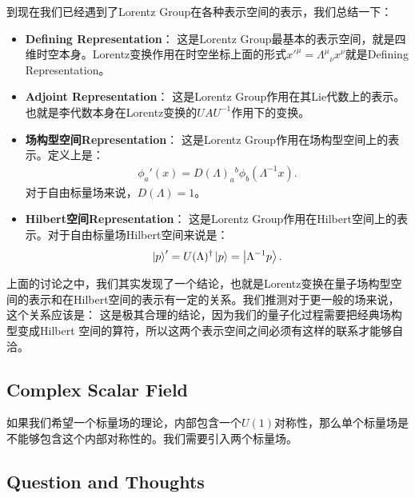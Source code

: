 到现在我们已经遇到了Lorentz Group在各种表示空间的表示，我们总结一下：
\begin{itemize}
  \item \textbf{Defining Representation}： 这是Lorentz
    Group最基本的表示空间，就是四维时空本身。Lorentz变换作用在时空坐标上面的形式$ x'^\mu =
    \Lambda^\mu{}_\nu x^\nu $就是Defining Representation。
  \item \textbf{Adjoint Representation}： 这是Lorentz
    Group作用在其Lie代数上的表示。也就是李代数本身在Lorentz变换的$ U A U^{-1} $作用下的变换。
  \item \textbf{场构型空间Representation}： 这是Lorentz Group作用在场构型空间上的表示。定义上是：
    \begin{align}
      \phi_a'(x) = D(\Lambda)_a{}^b \phi_b(\Lambda^{-1}x).
    \end{align}
    对于自由标量场来说，$ D(\Lambda) = 1 $。
  \item \textbf{Hilbert空间Representation}： 这是Lorentz
    Group作用在Hilbert空间上的表示。对于自由标量场Hilbert空间来说是：
    \begin{align}
      \ket{p}' = U(\Lambda)^\dagger \ket{p} = \ket{\Lambda^{-1}p}.
    \end{align}
\end{itemize}
上面的讨论之中，我们其实发现了一个结论，也就是Lorentz变换在量子场构型空间的表示和在Hilbert空间的表示有一定的关系。我们推测对于更一般的场来说，这个关系应该是：
这是极其合理的结论，因为我们的量子化过程需要把经典场构型变成Hilbert 空间的算符，所以这两个表示空间之间必须有这样的联系才能够自洽。

\subsection{Complex Scalar Field}

如果我们希望一个标量场的理论，内部包含一个$ U(1) $对称性，那么单个标量场是不能够包含这个内部对称性的。我们需要引入两个标量场。

\subsection{Question and Thoughts}

